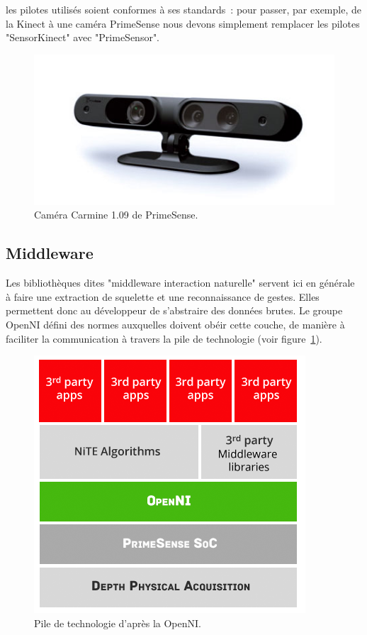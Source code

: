 \documentclass[french,12pt]{report}
\begin{document}
  les pilotes utilisés soient conformes à ses standards~: pour passer, par 
  exemple, de la Kinect à une caméra PrimeSense nous devons simplement remplacer 
  les pilotes "SensorKinect" avec "PrimeSensor".
  \begin{figure}[h!]
  \centering
  \includegraphics[width=0.6\linewidth]{images/primesense_camera}
  \caption{Caméra Carmine 1.09 de PrimeSense.}
  \end{figure}
  
  
  \subsection{Middleware}
  Les bibliothèques dites "middleware interaction naturelle" servent ici en 
  générale à faire une 
  extraction de squelette et une reconnaissance de gestes. Elles permettent donc 
  au développeur de s'abstraire des données brutes. Le groupe OpenNI défini 
  des normes auxquelles doivent obéir cette couche, de 
  manière à faciliter la communication à travers la pile de technologie (voir 
  figure~\ref{fig:openni_technology_stack}).
  \begin{figure}[h!]
  \centering
  \includegraphics[width=0.7\linewidth]{images/openni_technology_stack}
  \caption{Pile de technologie d'après la OpenNI.}
  \label{fig:openni_technology_stack}
  \end{figure}
  
\end{document}
